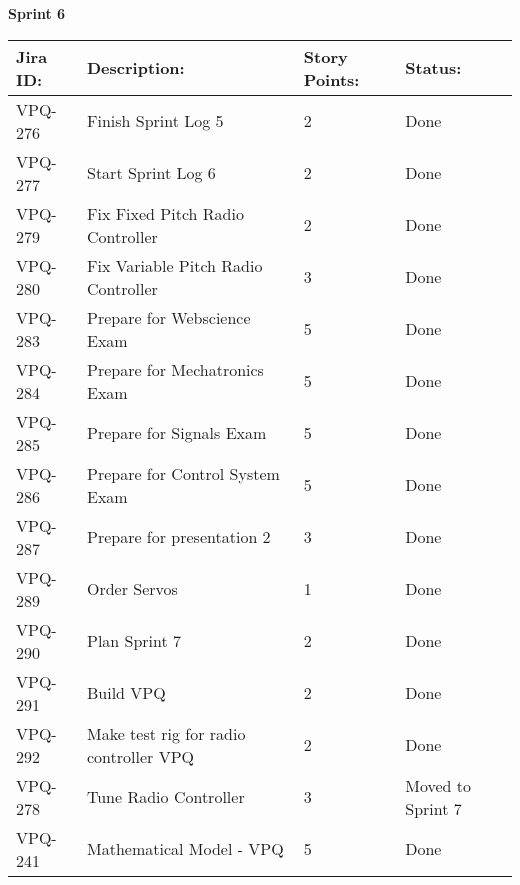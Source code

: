 \begin{table}[ht]
\centering\textbf{Sprint 6}
\begin{tabularx}{\linewidth}{|m{1.5cm} m{8.3cm} m{1.5cm} m{3.5cm}|}
\hline
    \rowcolor{cadetgrey} 
     \textbf{Jira ID:} & \textbf{Description:} &  \textbf{Story Points:} & \textbf{Status: } \\ \hline
      VPQ-276 & Finish Sprint Log 5 & 2\centering & Done  \\ 
\rowcolor{gainsboro} VPQ-277 &  Start Sprint Log 6 & 2\centering & Done  \\
      VPQ-279 & Fix Fixed Pitch Radio Controller  & 2\centering & Done  \\
\rowcolor{gainsboro} VPQ-280 &  Fix Variable Pitch Radio Controller & 3\centering & Done  \\
      VPQ-283 & Prepare for Webscience Exam & 5\centering & Done  \\
\rowcolor{gainsboro} VPQ-284 &  Prepare for Mechatronics Exam & 5\centering & Done  \\
      VPQ-285 & Prepare for Signals Exam & 5\centering & Done  \\
\rowcolor{gainsboro} VPQ-286 &  Prepare for Control System Exam & 5\centering & Done  \\    
      VPQ-287 & Prepare for presentation 2 & 3\centering & Done  \\
\rowcolor{gainsboro}  VPQ-289 &  Order Servos & 1\centering & Done  \\
    VPQ-290 & Plan Sprint 7  & 2\centering & Done  \\
\rowcolor{gainsboro}  VPQ-291 &  Build VPQ & 2\centering & Done  \\
    VPQ-292 & Make test rig for radio controller VPQ & 2\centering & Done  \\
\rowcolor{gainsboro}  VPQ-278 &  Tune Radio Controller & 3\centering & Moved to Sprint 7  \\
        VPQ-241 & Mathematical Model - VPQ & 5\centering & Done  \\
\hline    
\end{tabularx}
\end{table}



